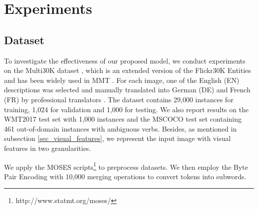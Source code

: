 \documentclass[sigconf]{acmart}
\begin{document}
\iffalse
As mentioned previously, we exploit two capsule networks for visual features in different granularities. Thus, we can obtain two multimodal context vectors  and , which can be further fused via the following gating mechanism: 


where  and  are learnable parameters. 
Afterwards,  will be exploited by our decoder for better translation prediction (\textbf{Eq.} \ref{equ_ffn}).
\fi





\section{Experiments}
\subsection{Dataset}
To investigate the effectiveness of our proposed model, we  conduct experiments on the Multi30K dataset \cite{elliott2016multi30k}, 
which is an extended version of the Flickr30K Entities and has been widely used in MMT \cite{mmt18,mmt17,mmt16}.
For each image, one of the English (EN) descriptions was selected and manually translated into German (DE) and French (FR) by professional translators \cite{mmt16}. The dataset
contains 29,000 instances for training, 1,024 for validation and 1,000 for testing. 
We also report results on the WMT2017 test set with 1,000 instances and the MSCOCO test set containing 461 out-of-domain instances with ambiguous verbs.
Besides, as mentioned in subsection \ref{sec_visual_features}, we represent the input image with visual features in two granularities.

We apply the MOSES scripts\footnote{http://www.statmt.org/moses/} to preprocess datasets.  We then employ the Byte Pair Encoding \cite{sennrich2015neural} with 10,000 merging operations to convert tokens into subwords.
\end{document}
